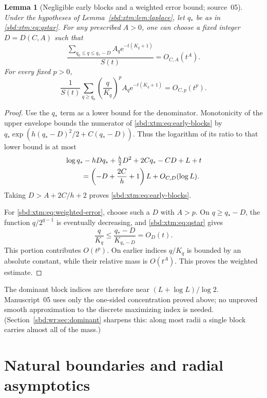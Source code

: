\documentclass[11pt,a4paper]{article}
\newtheorem{lemma}[theorem]{Lemma}
\theoremstyle{definition}
\newcommand{\e}{\mathrm e}
\begin{document}
\begin{lemma}[Negligible early blocks and a weighted error bound; source~05]
\label{sbd:xtm:lem:concentration}
Under the hypotheses of Lemma~\ref{sbd:xtm:lem:laplace}, let $q_*$ be as in
\eqref{sbd:xtm:eq:qstar}. For any prescribed $A>0$, one can choose a fixed
integer $D=D(C,A)$ such that
\begin{equation}\label{sbd:xtm:eq:early-blocks}
 \frac{\sum_{q_0\le q\le q_*-D}A_q\e^{-t(K_q+1)}}{S(t)}
 =O_{C,A}(t^A).
\end{equation}
For every fixed $p>0$,
\begin{equation}\label{sbd:xtm:eq:weighted-error}
 \frac1{S(t)}\sum_{q\ge q_0}
       \left(\frac q{K_q}\right)^p A_q\e^{-t(K_q+1)}
 =O_{C,p}(t^p).
\end{equation}
\end{lemma}
\begin{proof}
Use the $q_*$ term as a lower bound for the denominator. Monotonicity
of the upper envelope bounds the numerator of \eqref{sbd:xtm:eq:early-blocks}
by $q_*\exp(h(q_*-D)^2/2+C(q_*-D))$. Thus the logarithm of its
ratio to that lower bound is at most
\begin{align*}
 &\log q_*-hDq_*+\tfrac h2D^2+2Cq_*-CD+L+t\\
 &\hspace{8mm}=\left(-D+\frac{2C}h+1\right)L+O_{C,D}(\log L).
\end{align*}
Taking $D>A+2C/h+2$ proves \eqref{sbd:xtm:eq:early-blocks}.

For \eqref{sbd:xtm:eq:weighted-error}, choose such a $D$ with $A>p$.
On $q\ge q_*-D$, the function $q/2^{q-1}$ is eventually decreasing,
and \eqref{sbd:xtm:eq:qstar} gives
\[
 \frac q{K_q}\le\frac{q_*-D}{K_{q_*-D}}=O_D(t).
\]
This portion contributes $O(t^p)$. On earlier indices $q/K_q$ is
bounded by an absolute constant, while their relative mass is
$O(t^A)$. This proves the weighted estimate.
\end{proof}

The dominant block indices are therefore near $(L+\log L)/\log2$.
Manuscript~05 uses only the one-sided concentration proved above; no
unproved smooth approximation to the discrete maximizing index is needed.
(Section~\ref{sbd:wr:sec:dominant} sharpens this: along most radii a
single block carries almost all of the mass.)

\section{Natural boundaries and radial asymptotics}
\label{sbd:xtm:sec:boundary}
\end{document}
